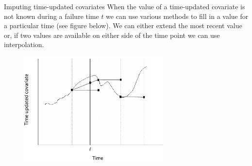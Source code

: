 \documentclass[envcountsect, 10pt, portrait, palatino]{beamer}
\begin{document}
\begin{frame}{Imputing time-updated covariates}
When the value of a time-updated covariate is not known during a failure time $t$ we can use various methods to fill in a value for a particular time (see figure below).  We can either extend the most recent value or, if two values  are available on either side of the time point we can use interpolation.
\begin{figure}[ht]
\centerline{\includegraphics[width=3in]{lect8_g1.pdf}}
\end{figure}
\end{frame} 
\end{document}
